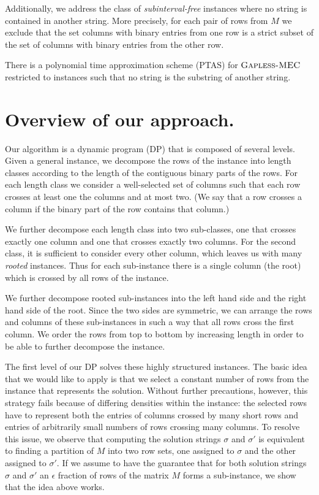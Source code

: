 Additionally, we address the class of \emph{subinterval-free} \GMEC instances where no string is contained in another string.
More precisely, for each pair of rows from $M$ we exclude that the set columns with binary entries from one row is a strict subset of
the set of columns with binary entries from the other row.

\begin{theorem}\label{thm:ptas}
    There is a polynomial time approximation scheme (PTAS) for $\textsc{Gapless-MEC}$ restricted to instances such that no string is the substring of another string.
\end{theorem}

\section{Overview of our approach.}

Our algorithm is a dynamic program (DP) that is composed of several levels.
Given a general \GMEC instance, we decompose the rows of the instance into length classes according to the length of the contiguous binary parts of the rows.
For each length class we consider a well-selected set of columns such that each row crosses at least one the columns and at most two.
(We say that a row crosses a column if the binary part of the row contains that column.)

We further decompose each length class into two sub-classes, one that crosses exactly one column and one that crosses exactly two columns.
For the second class, it is sufficient to consider every other column, which leaves us with many \emph{rooted} instances.
Thus for each sub-instance there is a single column (the root) which is crossed by all rows of the instance.

We further decompose rooted sub-instances into the left hand side and the right hand side of the root.
Since the two sides are symmetric, we can arrange the rows and columns of these sub-instances in such a way that all rows cross the first column.
We order the rows from top to bottom by increasing length in order to be able to further decompose the instance.

The first level of our DP solves these highly structured instances.
The basic idea that we would like to apply is that we select a constant number of rows from the instance that represents the solution.
Without further precautions, however, this strategy fails because of differing densities within the instance: 
the selected rows have to represent both the entries of columns crossed by many short rows and entries of arbitrarily small numbers of rows crossing many columns.
To resolve this issue, we observe that computing the solution strings $\sigma$ and $\sigma'$ is equivalent to finding a partition of $M$ into two row sets, one assigned to $\sigma$ and the other assigned to $\sigma'$.
If we assume to have the guarantee that for both solution strings $\sigma$ and $\sigma'$ an $\epsilon$ fraction of rows of the matrix $M$ forms a \BMEC sub-instance, we show that the idea above works.

